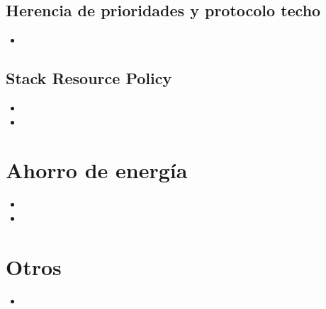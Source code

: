 \documentclass{article}
\begin{document}
\subsection*{Herencia de prioridades y protocolo techo}
\begin{itemize}
    \item {}
\end{itemize}

\subsection*{Stack Resource Policy}
\begin{itemize}
    \item {}
    \item {}
\end{itemize}

\section{Ahorro de energía}
\begin{itemize}
    \item {}
    \item {}
\end{itemize}

\section{Otros}
\begin{itemize}
    \item {}
\end{itemize}
\end{document}
